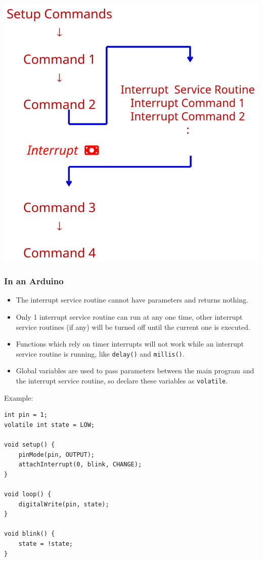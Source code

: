 \documentclass[11pt]{article}
\begin{document}
\begin{center}
\includegraphics[width=.9\linewidth]{./images/interrupt-service-routine-diagram.png}
\end{center}

 \newpage
\subsubsection{In an Arduino}
\label{sec:orgf4f9b61}
\begin{itemize}
\item The interrupt service routine cannot have parameters and returns nothing.
\item Only 1 interrupt service routine can run at any one time, other interrupt service routines (if any) will be turned off until the current one is executed.
\item Functions which rely on timer interrupts will not work while an interrupt service routine is running, like \texttt{delay()} and \texttt{millis()}.
\item Global variables are used to pass parameters between the main program and the interrupt service routine, so declare these variables as \texttt{volatile}.
\end{itemize}

Example:
\begin{verbatim}
int pin = 1;
volatile int state = LOW;

void setup() {
    pinMode(pin, OUTPUT);
    attachInterrupt(0, blink, CHANGE);
}

void loop() {
    digitalWrite(pin, state);
}

void blink() {
    state = !state;
}
\end{verbatim}
\end{document}

